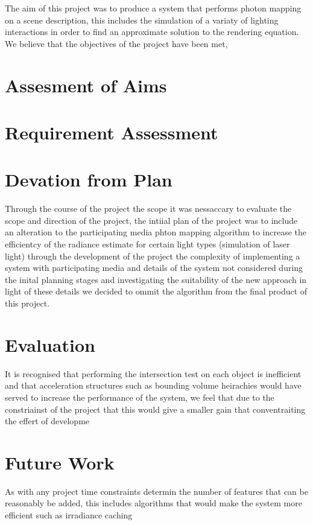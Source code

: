 The aim of this project was to produce a system that performs photon mapping on a scene description, this includes the simulation of
a variaty of lighting interactions in order to find an approximate solution to the rendering equation. We believe that the objectives
of the project have been met, 

\section{Assesment of Aims}

\section{Requirement Assessment}

\section{Devation from Plan}
Through the course of the project the scope it was nessaccary to evaluate the scope and direction of the project, the intiial plan
of the project was to include an alteration to the participating media phton mapping algorithm to increase the efficientcy of the
radiance estimate for certain light types (simulation of laser light) through the development of the project the complexity of
implementing a system with participating media and details of the system not considered during the inital planning stages and
investigating the suitability of the new approach in light of these details we decided to ommit the algorithm from the final product
of this project.

\section{Evaluation}
It is recognised that performing the
intersection test on each object is inefficient and that acceleration structures such as bounding volume heirachies would
have served to increase the performance of the system, we feel that due to the constriainst of the project that this
would give a smaller gain that conventraiting the effert of developme

\section{Future Work}
As with any project time constraints determin the number of features that can be reasonably be added, this includes algorithms that
would make the system more efficient such as irradiance caching

